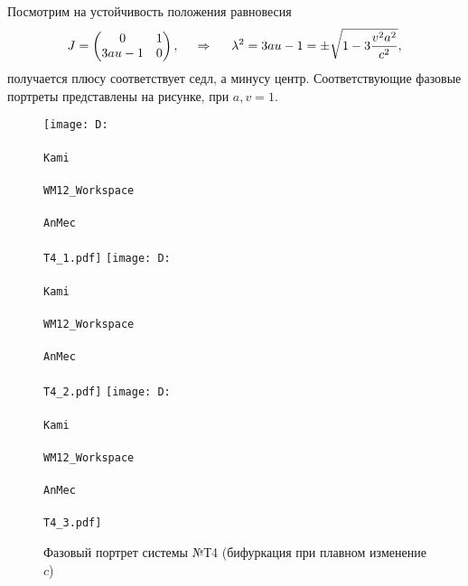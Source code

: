 \noindent
Посмотрим на устойчивость положения равновесия
\begin{equation*}
    J = \begin{pmatrix}
        0 & 1 \\
        3au-1 & 0 \\
    \end{pmatrix},
    \hspace{0.5cm} \Rightarrow \hspace{0.5cm}
    \lambda^2 = 3 a u - 1 = \pm \sqrt{1 - 3 \frac{v^2 a^2}{c^2}},
\end{equation*}
получается плюсу соответствует седл, а минусу центр. Соответствующие фазовые портреты представлены на рисунке, при $a,v=1$.
\begin{figure}[ht]
    \centering
    \texttt{[image: D:\\\\Kami\\\\WM12\_Workspace\\\\AnMec\\\\T4\_1.pdf]}
    \hspace{0.2cm}
    \texttt{[image: D:\\\\Kami\\\\WM12\_Workspace\\\\AnMec\\\\T4\_2.pdf]}
    \hspace{0.2cm}
    \texttt{[image: D:\\\\Kami\\\\WM12\_Workspace\\\\AnMec\\\\T4\_3.pdf]}
    \caption{Фазовый портрет системы №Т4 (бифуркация при плавном изменение $c$)}
\end{figure}



